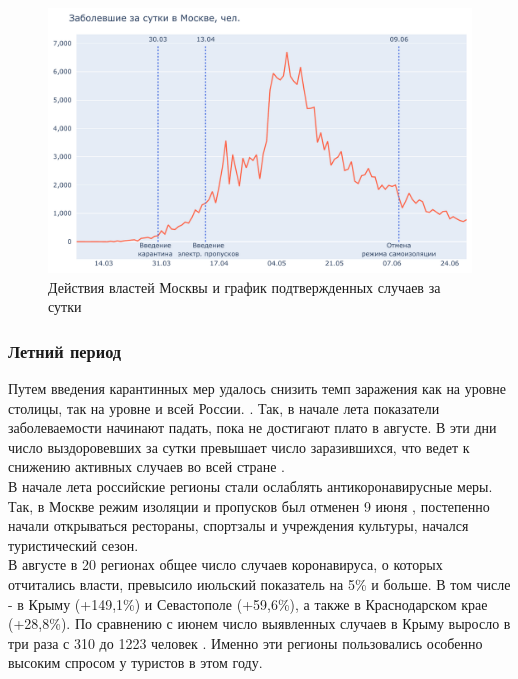 \documentclass[a4paper, 12pt]{extarticle}
\begin{document}
\begin{figure}[h]
    \centering
    \includegraphics[scale=0.55]{../plots/7daily_confirmed_with_events_moscow_1.pdf}
    \caption{Действия властей Москвы и график подтвержденных случаев за сутки}
    \label{fig:day_confirmed_moscow_with_events1}
\end{figure}

\subsubsection{Летний период}
Путем введения карантинных мер удалось снизить темп заражения как на уровне
столицы, так на уровне и всей России. . Так, в начале лета показатели
заболеваемости начинают падать, пока не достигают плато в августе. В эти дни
число выздоровевших за сутки превышает число заразившихся, что ведет к снижению
активных случаев во всей стране .
\\

В начале лета российские регионы стали ослаблять антикоронавирусные меры. Так,
в Москве режим изоляции и пропусков был отменен 9 июня
, постепенно начали
открываться рестораны, спортзалы и учреждения культуры, начался туристический
сезон.
\\

В августе в 20 регионах общее число случаев коронавируса, о которых отчитались
власти, превысило июльский показатель на 5\% и больше. В том числе - в Крыму
(+149,1\%) и Севастополе (+59,6\%), а также в Краснодарском крае (+28,8\%). По
сравнению с июнем число выявленных случаев в Крыму выросло в три раза с 310 до
1223 человек . Именно эти регионы
пользовались особенно высоким спросом у туристов в этом году.
\end{document}
